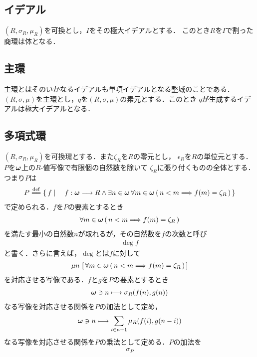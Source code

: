 \subsection{イデアル}
	$(R,\sigma_R,\mu_R)$を可換とし，$I$をその極大イデアルとする．
	このとき$R$を$I$で割った商環は体となる．
	
\subsection{主環}
	主環とはそのいかなるイデアルも単項イデアルとなる整域のことである．
	$(R,\sigma,\mu)$を主環とし，$q$を$(R,\sigma,\mu)$の素元とする．このとき
	$q$が生成するイデアルは極大イデアルとなる．
	
\subsection{多項式環}
	$(R,\sigma_R,\mu_R)$を可換環とする．また$\zeta_R$を$R$の零元とし，
	$\epsilon_R$を$R$の単位元とする．
	$P$を${\boldsymbol \omega}$上の$R$-値写像で有限個の自然数を除いて
	$\zeta_R$に張り付くものの全体とする．つまり$P$は
	\begin{align}
		P \defeq \Set{f}{f:\Natural \longrightarrow R \wedge
		\exists n \in \Natural\, \forall m \in \Natural\,
		(\, n < m \Longrightarrow f(m) = \zeta_R\, )}
	\end{align}
	で定められる．$f$を$P$の要素とするとき
	\begin{align}
		\forall m \in {\boldsymbol \omega}\, (\, n < m \Longrightarrow f(m) = \zeta_R\, )
	\end{align}
	を満たす最小の自然数$n$が取れるが，その自然数を$f$の次数と呼び
	\begin{align}
		\deg{f}
	\end{align}
	と書く．さらに言えば，$\deg$とは$f$に対して
	\begin{align}
		\mu n\, \left[\, \forall m \in {\boldsymbol \omega}\, (\, n < m \Longrightarrow f(m) = \zeta_R\, )\, \right]
	\end{align}
	を対応させる写像である．$f$と$g$を$P$の要素とするとき
	\begin{align}
		{\boldsymbol \omega} \ni n \longmapsto \sigma_R(f(n),g(n))
	\end{align}
	なる写像を対応させる関係を$P$の加法として定め，
	\begin{align}
		{\boldsymbol \omega} \ni n \longmapsto \sum_{i \in n+1} \mu_R(f(i),g(n-i))
	\end{align}
	なる写像を対応させる関係を$P$の乗法として定める．$P$の加法を
	\begin{align}
		\sigma_P
	\end{align}
